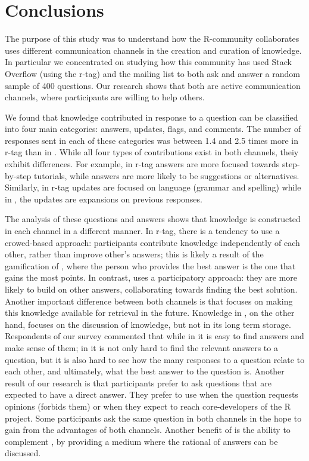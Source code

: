 \section{Conclusions}
\label{cha:conclusion}

The purpose of this study was to understand how the R-community collaborates uses different communication channels in the creation and curation of knowledge.
In particular we concentrated on studying how this community has used Stack Overflow (using the r-tag) and the \RH mailing list to both ask and answer
a random sample of 400 questions. Our research shows that both are active communication channels, where participants are willing to help others. 

We found that knowledge contributed in response to a question can be classified into four main categories: answers, updates, flags, and comments. The number of
responses sent in each of these categories was between 1.4 and 2.5 times more in \SO r-tag than in \RH. While all four types of contributions exist in both
channels, theiy exhibit differences. For example, in \SO r-tag answers are more focused towards step-by-step tutorials, while \RH answers are more
likely to be suggestions or alternatives. Similarly, in \SO r-tag updates are focused on language (grammar and spelling) while in \RH, the updates are
expansions on previous responses.

The analysis of these questions and answers shows that knowledge is constructed in each channel in a different manner. In \SO r-tag, there is a tendency to use
a crowed-based approach: participants contribute knowledge independently of each other, rather than improve other's answers; this is likely a result of the
gamification of \SO, where the person who provides the best answer is the one that gains the most points.
In contrast, \RH uses a participatory approach: they are more likely to build on other answers, collaborating towards finding the best solution.
Another important difference between both channels is that \SO focuses on making this knowledge available for retrieval in the future. Knowledge in \RH, on the
other hand, focuses on the discussion of knowledge, but not in its long term storage. Respondents of our survey commented that while in \SO it is easy to find answers
and make sense of them; in \RH it is not only hard to find the relevant answers to a question, but it is also hard to see how the many responses to a question
relate to each other, and ultimately, what the best answer to the question is.
Another result of our research is that participants prefer \SO to ask questions that are expected to have a direct answer. They prefer to use \RH when the
question requests opinions (\SO forbids them) or when they expect to reach core-developers of the R project. Some participants ask the same question in both
channels in the hope to gain from the advantages of both channels. Another benefit of \RH is the ability to complement \SO, by providing a medium where the rational
of answers can be discussed.

